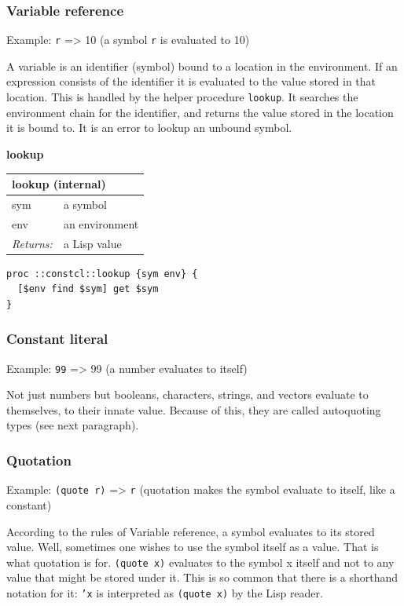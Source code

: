 \documentclass[twoside,9pt]{report}
\begin{document}
\subsubsection{Variable reference}
\label{variable-reference}

Example: \texttt{r} => 10 (a symbol \texttt{r} is evaluated to 10)


A variable is an identifier (symbol) bound to a location in the environment. If an expression consists of the identifier it is evaluated to the value stored in that location. This is handled by the helper procedure \texttt{lookup}. It searches the environment chain for the identifier, and returns the value stored in the location it is bound to. It is an error to lookup an unbound symbol.


\textbf{lookup}

\begin{tabular}{ |l l| }
\hline
\multicolumn{2}{|l|}{lookup (internal)} \\
\hline
sym & a symbol \\
env & an environment \\
\textit{Returns:} & a Lisp value \\
\hline
\end{tabular}

\noindent\makebox[\linewidth]{\rule{\linewidth}{0.4pt}}
\begin{lstlisting}
proc ::constcl::lookup {sym env} {
  [$env find $sym] get $sym
}
\end{lstlisting}
\noindent\makebox[\linewidth]{\rule{\linewidth}{0.4pt}}
\subsubsection{Constant literal}
\label{constant-literal}

Example: \texttt{99} => 99 (a number evaluates to itself)


Not just numbers but booleans, characters, strings, and vectors evaluate to themselves, to their innate value. Because of this, they are called autoquoting types (see next paragraph).

\subsubsection{Quotation}
\label{quotation}

Example: \texttt{(quote r)} => \texttt{r} (quotation makes the symbol evaluate to itself, like a constant)


According to the rules of Variable reference, a symbol evaluates to its stored value. Well, sometimes one wishes to use the symbol itself as a value. That is what quotation is for. \texttt{(quote x)} evaluates to the symbol x itself and not to any value that might be stored under it. This is so common that there is a shorthand notation for it: \texttt{'x} is interpreted as \texttt{(quote x)} by the Lisp reader.
\end{document}
